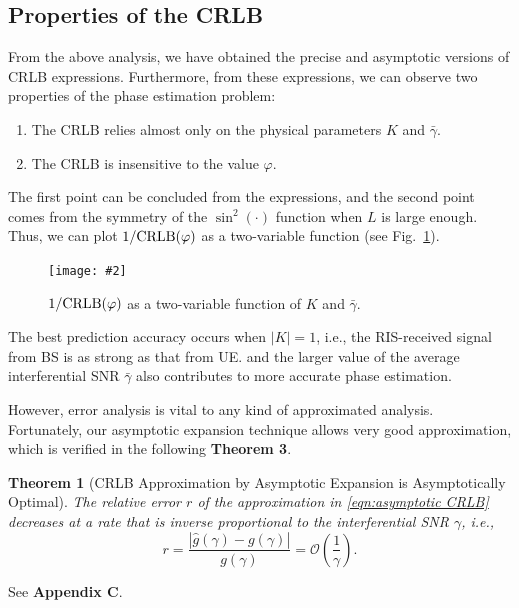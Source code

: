 \documentclass[12pt,draftclsnofoot,journal,onecolumn]{IEEEtran}
\newtheorem{theorem}{\bf Theorem}
\theoremstyle{nonumberplain}
\newcommand{\myincludegraphics}[2][width=12cm]{\texttt{[image: \#2]}}
\begin{document}
\subsection{Properties of the CRLB}
    From the above analysis, we have obtained the precise and asymptotic versions of CRLB expressions. Furthermore, from these expressions, we can observe two properties of the phase estimation problem:
    \begin{enumerate}
        \item The CRLB relies almost only on the physical parameters $K$ and $\bar{\gamma}$.
        \item The CRLB is insensitive to the value $\varphi$.
    \end{enumerate}
    The first point can be concluded from the expressions, and the second point comes from the symmetry of the $\sin^2(\cdot)$ function when $L$ is large enough. Thus, we can plot $1/{\rm CRLB}(\varphi)$ as a two-variable function (see Fig.~\ref{fig:CRLB two variable}). 
    \begin{figure}[!t]
        \centering
        \myincludegraphics{figures/crlb.pdf}
        \caption{$1/{\rm CRLB}(\varphi)$ as a two-variable function of $K$ and $\bar{\gamma}$.}
        \label{fig:CRLB two variable}
    \end{figure}
    The best prediction accuracy occurs when $\lvert K \rvert = 1$, i.e., the RIS-received signal from BS is as strong as that from UE. and the larger value of the average interferential SNR $\bar{\gamma}$ also contributes to more accurate phase estimation. 

    However, error analysis is vital to any kind of approximated analysis. Fortunately, our asymptotic expansion technique allows very good approximation, which is verified in the following {\bf Theorem 3}. 

    \begin{theorem}[CRLB Approximation by Asymptotic Expansion is Asymptotically Optimal]
        The relative error $r$ of the approximation in \eqref{eqn:asymptotic CRLB} decreases at a rate that is inverse proportional to the interferential SNR $\gamma$, i.e.,
        \begin{equation}
            r=\frac{\left|\hat{g}(\gamma)-g(\gamma)\right|}{g(\gamma)} = \mathcal{O}\left(\frac{1}{\gamma}\right).
        \end{equation}
    \end{theorem}
    \begin{IEEEproof}
        See {\bf Appendix C}. 
    \end{IEEEproof}
\end{document}
